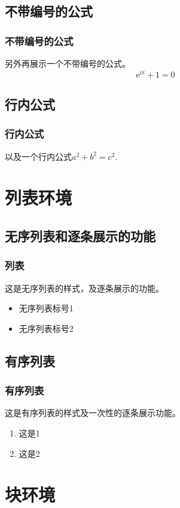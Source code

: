\documentclass[aspectratio=169, 10pt, utf8, mathserif]{beamer}
\begin{document}
\subsection{不带编号的公式}
\begin{frame}
 \frametitle{不带编号的公式}
 另外再展示一个不带编号的公式。
\[
\mathrm e^{\mathrm i \pi} + 1 = 0 
\]
\end{frame}

\subsection{行内公式}
\begin{frame}
 \frametitle{行内公式}
 以及一个行内公式$a^2 + b^2 = c^2$.
\end{frame}

\section{列表环境}
\subsection{无序列表和逐条展示的功能}
\begin{frame}
 \frametitle{列表}
这是无序列表的样式，及逐条展示的功能。
 \begin{itemize}
 \item 无序列表标号1
 \pause
 \item 无序列表标号2
 \end{itemize}
\end{frame}

\subsection{有序列表}
\begin{frame}
 \frametitle{有序列表}
这是有序列表的样式及一次性的逐条展示功能。
 \begin{enumerate}[<+-|alert@+>]
 \item 这是1
 \item 这是2
 \end{enumerate}
\end{frame}

\section{块环境}
\end{document}
